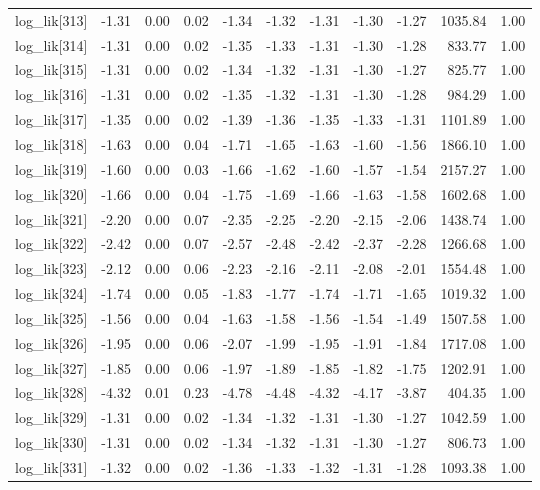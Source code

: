 \begin{table}[ht]
\begin{tabular}{rrrrrrrrrrr}
  log\_lik[313] & -1.31 & 0.00 & 0.02 & -1.34 & -1.32 & -1.31 & -1.30 & -1.27 & 1035.84 & 1.00 \\ 
  log\_lik[314] & -1.31 & 0.00 & 0.02 & -1.35 & -1.33 & -1.31 & -1.30 & -1.28 & 833.77 & 1.00 \\ 
  log\_lik[315] & -1.31 & 0.00 & 0.02 & -1.34 & -1.32 & -1.31 & -1.30 & -1.27 & 825.77 & 1.00 \\ 
  log\_lik[316] & -1.31 & 0.00 & 0.02 & -1.35 & -1.32 & -1.31 & -1.30 & -1.28 & 984.29 & 1.00 \\ 
  log\_lik[317] & -1.35 & 0.00 & 0.02 & -1.39 & -1.36 & -1.35 & -1.33 & -1.31 & 1101.89 & 1.00 \\ 
  log\_lik[318] & -1.63 & 0.00 & 0.04 & -1.71 & -1.65 & -1.63 & -1.60 & -1.56 & 1866.10 & 1.00 \\ 
  log\_lik[319] & -1.60 & 0.00 & 0.03 & -1.66 & -1.62 & -1.60 & -1.57 & -1.54 & 2157.27 & 1.00 \\ 
  log\_lik[320] & -1.66 & 0.00 & 0.04 & -1.75 & -1.69 & -1.66 & -1.63 & -1.58 & 1602.68 & 1.00 \\ 
  log\_lik[321] & -2.20 & 0.00 & 0.07 & -2.35 & -2.25 & -2.20 & -2.15 & -2.06 & 1438.74 & 1.00 \\ 
  log\_lik[322] & -2.42 & 0.00 & 0.07 & -2.57 & -2.48 & -2.42 & -2.37 & -2.28 & 1266.68 & 1.00 \\ 
  log\_lik[323] & -2.12 & 0.00 & 0.06 & -2.23 & -2.16 & -2.11 & -2.08 & -2.01 & 1554.48 & 1.00 \\ 
  log\_lik[324] & -1.74 & 0.00 & 0.05 & -1.83 & -1.77 & -1.74 & -1.71 & -1.65 & 1019.32 & 1.00 \\ 
  log\_lik[325] & -1.56 & 0.00 & 0.04 & -1.63 & -1.58 & -1.56 & -1.54 & -1.49 & 1507.58 & 1.00 \\ 
  log\_lik[326] & -1.95 & 0.00 & 0.06 & -2.07 & -1.99 & -1.95 & -1.91 & -1.84 & 1717.08 & 1.00 \\ 
  log\_lik[327] & -1.85 & 0.00 & 0.06 & -1.97 & -1.89 & -1.85 & -1.82 & -1.75 & 1202.91 & 1.00 \\ 
  log\_lik[328] & -4.32 & 0.01 & 0.23 & -4.78 & -4.48 & -4.32 & -4.17 & -3.87 & 404.35 & 1.00 \\ 
  log\_lik[329] & -1.31 & 0.00 & 0.02 & -1.34 & -1.32 & -1.31 & -1.30 & -1.27 & 1042.59 & 1.00 \\ 
  log\_lik[330] & -1.31 & 0.00 & 0.02 & -1.34 & -1.32 & -1.31 & -1.30 & -1.27 & 806.73 & 1.00 \\ 
  log\_lik[331] & -1.32 & 0.00 & 0.02 & -1.36 & -1.33 & -1.32 & -1.31 & -1.28 & 1093.38 & 1.00 \\ 

\end{tabular}
\end{table}
